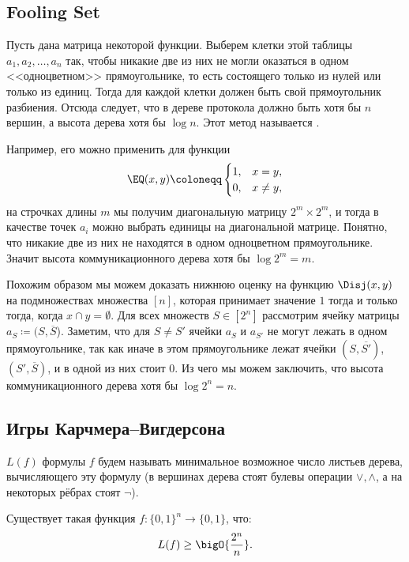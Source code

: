 \subsection{Fooling Set}

Пусть дана матрица некоторой функции. Выберем клетки этой таблицы $a_1, a_2, \ldots, a_n$ так, чтобы
никакие две из них не могли оказаться в одном <<одноцветном>> прямоугольнике, то есть состоящего только
из нулей или только из единиц. Тогда для каждой клетки должен быть свой прямоугольник разбиения. Отсюда
следует, что в дереве протокола должно быть хотя бы $n$ вершин, а высота дерева хотя бы $\log n$. Этот
метод называется .  

Например, его можно применить для функции
$$
    \EQ(x, y) \coloneqq
    \begin{cases}
        1, & x = y,\\
        0, & x \neq y,
    \end{cases}
$$
на строчках длины $m$ мы получим диагональную матрицу $2^m \times 2^m$, и тогда в качестве точек $a_i$
можно выбрать единицы на диагональной матрице. Понятно, что никакие две из них не находятся в одном
одноцветном прямоугольнике. Значит высота коммуникационного дерева хотя бы $\log 2^m = m$.

Похожим образом мы можем доказать нижнюю оценку на функцию $\Disj(x, y)$ на подмножествах множества
$[n]$, которая принимает значение $1$ тогда и только тогда, когда $ x \cap y = \emptyset$. Для всех
множеств $S \in [2^n]$ рассмотрим ячейку матрицы $a_S \coloneqq (S, \overline{S}$). Заметим, что для $S
\neq S'$ ячейки $a_S$ и $a_{S'}$ не могут лежать в одном прямоугольнике, так как иначе в этом
прямоугольнике лежат ячейки $(S, \overline{S'})$, $(S', \overline{S})$, и в одной из них стоит $0$. Из
чего мы можем заключить, что высота коммуникационного дерева хотя бы $\log 2^n = n$.  


\subsection{Игры Карчмера--Вигдерсона}

\begin{definition}
     $L(f)$ формулы $f$ будем называть минимальное возможное число листьев
    дерева, вычисляющего эту формулу (в вершинах дерева стоят булевы операции $\vee, \wedge$, а на
    некоторых рёбрах стоят $\neg $).
\end{definition}

\begin{theorem}[Шеннон]
    Существует такая функция $f\colon \{0, 1\}^n \to \{0, 1\}$, что:
    $$
        L(f) \ge \bigO{\frac{2^n}{n}}.
    $$
\end{theorem}

